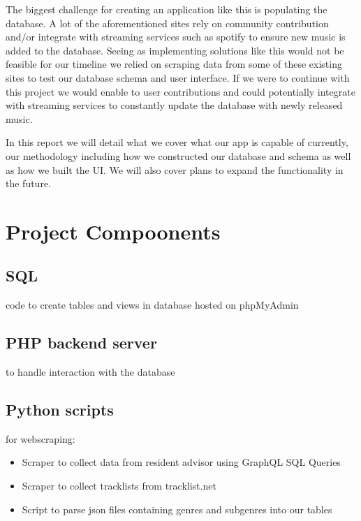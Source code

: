 \documentclass{article}
\begin{document}
The biggest challenge for creating an application like this is populating the database. A lot of the aforementioned sites rely on community contribution and/or integrate with streaming services such as spotify to ensure new music is added to the database. Seeing as implementing solutions like this would not be feasible for our timeline we relied on scraping data from some of these existing sites to test our database schema and user interface. If we were to continue with this project we would enable to user contributions and could potentially integrate with streaming services to constantly update the database with newly released music.

In this report we will detail what we cover what our app is capable of currently, our methodology including how we constructed our database and schema as well as how we built the UI. We will also cover plans to expand the functionality in the future.



\section{Project Compoonents}
    \subsection{SQL} code to create tables and views in database hosted on phpMyAdmin
    \subsection{PHP backend server} to handle interaction with the database
    \subsection{Python scripts} for webscraping:
    \begin{itemize}
        \item Scraper to collect data from resident advisor using GraphQL SQL Queries
        \item Scraper to collect tracklists from tracklist.net
        \item Script to parse json files containing genres and subgenres into our tables
    \end{itemize}
\end{document}
